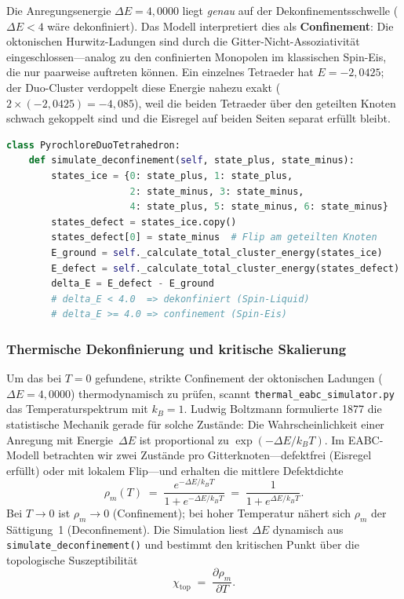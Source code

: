 \documentclass[11pt,a4paper]{article}
\begin{document}
Die Anregungsenergie $\Delta E = 4{,}0000$ liegt \emph{genau} auf der Dekonfinementsschwelle ($\Delta E < 4$ wäre dekonfiniert). Das Modell interpretiert dies als \textbf{Confinement}: Die oktonischen Hurwitz-Ladungen sind durch die Gitter-Nicht-Assoziativität eingeschlossen---analog zu den confinierten Monopolen im klassischen Spin-Eis, die nur paarweise auftreten können. Ein einzelnes Tetraeder hat $E = -2{,}0425$; der Duo-Cluster verdoppelt diese Energie nahezu exakt ($2 \times (-2{,}0425) = -4{,}085$), weil die beiden Tetraeder über den geteilten Knoten schwach gekoppelt sind und die Eisregel auf beiden Seiten separat erfüllt bleibt.

\begin{lstlisting}[language=Python,caption={Kern der Duo-Tetraeder-Simulation (gek\"urtzt).}]
class PyrochloreDuoTetrahedron:
    def simulate_deconfinement(self, state_plus, state_minus):
        states_ice = {0: state_plus, 1: state_plus,
                      2: state_minus, 3: state_minus,
                      4: state_plus, 5: state_minus, 6: state_minus}
        states_defect = states_ice.copy()
        states_defect[0] = state_minus  # Flip am geteilten Knoten
        E_ground = self._calculate_total_cluster_energy(states_ice)
        E_defect = self._calculate_total_cluster_energy(states_defect)
        delta_E = E_defect - E_ground
        # delta_E < 4.0  => dekonfiniert (Spin-Liquid)
        # delta_E >= 4.0 => confinement (Spin-Eis)
\end{lstlisting}

\subsubsection{Thermische Dekonfinierung und kritische Skalierung}

Um das bei $T=0$ gefundene, strikte Confinement der oktonischen Ladungen ($\Delta E = 4{,}0000$) thermodynamisch zu pr\"ufen, scannt \texttt{thermal\_eabc\_simulator.py} das Temperaturspektrum mit $k_B=1$. Ludwig Boltzmann formulierte 1877 die statistische Mechanik gerade f\"ur solche Zust\"ande: Die Wahrscheinlichkeit einer Anregung mit Energie~$\Delta E$ ist proportional zu $\exp(-\Delta E/k_B T)$. Im EABC-Modell betrachten wir zwei Zust\"ande pro Gitterknoten---defektfrei (Eisregel erf\"ullt) oder mit lokalem Flip---und erhalten die mittlere Defektdichte
\begin{equation}
  \rho_m(T) \;=\; \frac{e^{-\Delta E/k_B T}}{1 + e^{-\Delta E/k_B T}}
  \;=\; \frac{1}{1 + e^{\Delta E/k_B T}}.
  \label{eq:boltzmann-rho}
\end{equation}
Bei $T \to 0$ ist $\rho_m \to 0$ (Confinement); bei hoher Temperatur n\"ahert sich $\rho_m$ der S\"attigung~1 (Deconfinement). Die Simulation liest $\Delta E$ dynamisch aus \texttt{simulate\_deconfinement()} und bestimmt den kritischen Punkt \"uber die topologische Suszeptibilit\"at
\begin{equation}
  \chi_{\text{top}} \;=\; \frac{\partial \rho_m}{\partial T}.
  \label{eq:chi-top}
\end{equation}
\end{document}

